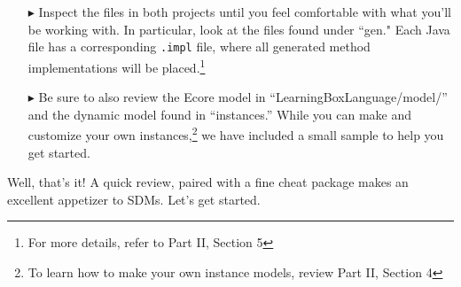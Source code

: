 \begin{itemize}

\item[$\blacktriangleright$] Inspect the files in both projects until you feel comfortable with what you'll be working with. In particular, look at the files
found under ``gen." Each Java file has a corresponding \texttt{.impl} file, where all generated method implementations will be placed.\footnote{For
more details, refer to Part II, Section 5} 

\item[$\blacktriangleright$] Be sure to also review the Ecore model in ``LearningBoxLanguage/model/'' and the dynamic model found in ``instances.'' While
you can make and customize your own instances,\footnote{To learn how to make your own instance models, review Part II, Section 4} we have included a small
sample to help you get started.

\end{itemize}

Well, that's it! A quick review, paired with a fine cheat package makes an excellent appetizer to SDMs. Let's get started.